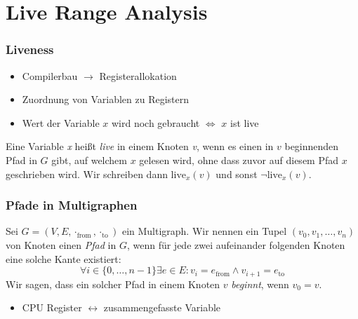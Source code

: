 \documentclass[onlymath]{beamer}
\begin{document}
\section{Live Range Analysis}

\begin{frame}
	\frametitle{Liveness}
	\begin{itemize}
		\item Compilerbau \pause $\rightarrow$ Registerallokation \pause
		\item Zuordnung von Variablen zu Registern \pause
		\item Wert der Variable $x$ wird noch gebraucht $\Leftrightarrow$ $x$ ist live \pause
	\end{itemize}
	\begin{definition}[Liveness]
		Eine Variable \textit{x} heißt \textit{live} in einem Knoten \textit{v}, wenn es einen in $v$ beginnenden Pfad in $G$ gibt, auf welchem $x$ gelesen wird, ohne dass zuvor auf diesem Pfad $x$ geschrieben wird. Wir schreiben dann $\textrm{live}_x(v)$ und sonst $\neg \textrm{live}_x(v)$.
	\end{definition}
\end{frame}

\newcommand{\mgtup}{$G = (V,E,\cdot_{\mathrm{from}}, \cdot_{\mathrm{to}})$}
\newcommand{\subfrom}{_{\mathrm{from}}}
\newcommand{\subto}{_{\mathrm{to}}}

\begin{frame}
	\frametitle{Pfade in Multigraphen}
	\begin{definition}[Pfad]
		Sei \mgtup{} ein Multigraph. Wir nennen ein Tupel $(v_0,v_1, \dots, v_n)$ von Knoten einen \emph{Pfad} in $G$, wenn für jede zwei aufeinander folgenden Knoten eine solche Kante existiert:
		\begin{equation*}
		\forall i \in \{0, \dots, n-1\} \exists e \in E : v_i = e\subfrom \land v_{i+1} = e\subto
		\end{equation*}
		Wir sagen, dass ein solcher Pfad in einem Knoten $v$ \emph{beginnt}, wenn $v_0 = v$.
	\end{definition}
\pause
\begin{itemize}
	\item CPU Register \pause $\leftrightarrow$ zusammengefasste Variable
\end{itemize}
\end{frame}
\end{document}
